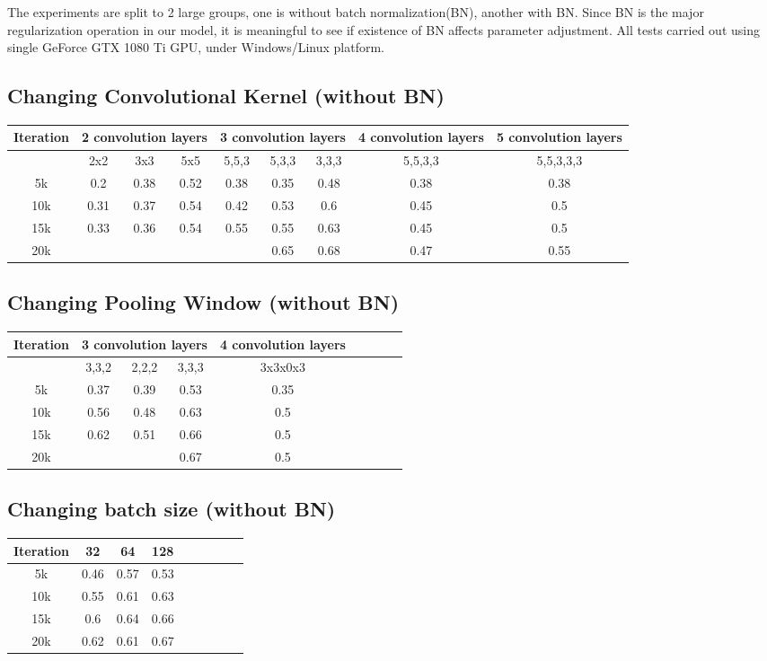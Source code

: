 \documentclass[journal,onecolumn, 12pt]{IEEEtran}
\begin{document}
The experiments are split to 2 large groups, one is without batch normalization(BN), another with BN. Since BN is the major regularization operation in our model, it is meaningful to see if existence of BN affects parameter adjustment. All tests carried out using single GeForce GTX 1080 Ti GPU, under Windows/Linux platform. 

\subsection{Changing Convolutional Kernel (without BN)}

\begin{tabular}{*9c}
  \hline
Iteration & \multicolumn{3}{c}{2 convolution layers} & \multicolumn{3}{c}{3 convolution layers} & \multicolumn{1}{c}{4 convolution layers} & \multicolumn{1}{c}{5 convolution layers} \\
\hline
{} & 2x2 & 3x3 & 5x5 & 5,5,3 & 5,3,3 & 3,3,3 & 5,5,3,3 & 5,5,3,3,3 \\
\hline
5k & 0.2 & 0.38 & 0.52 & 0.38 & 0.35 & 0.48 & 0.38 & 0.38 \\
10k & 0.31 & 0.37 & 0.54 & 0.42 & 0.53 & 0.6 & 0.45 & 0.5 \\
15k & 0.33 & 0.36 & 0.54 & 0.55 & 0.55 & 0.63 & 0.45 & 0.5 \\
20k & {} & {} & {} & {} & 0.65 & 0.68 & 0.47 & 0.55 \\
\hline
\end{tabular}

\subsection{Changing Pooling Window (without BN)}
\begin{tabular}{*9c}
  \hline
Iteration & \multicolumn{3}{c}{3 convolution layers} & \multicolumn{1}{c}{4 convolution layers} \\
\hline
{} & 3,3,2 & 2,2,2 & 3,3,3 & 3x3x0x3 \\
\hline
5k & 0.37 & 0.39 & 0.53 & 0.35 \\
10k & 0.56 & 0.48 & 0.63 & 0.5 \\
15k & 0.62 & 0.51 & 0.66 & 0.5 \\
20k & {} & {} & 0.67 & 0.5 \\
\hline
\end{tabular}

\subsection{Changing batch size (without BN)}
\begin{tabular}{*9c}
  \hline
Iteration & 32 & 64 & 128\\
\hline
5k & 0.46 & 0.57 & 0.53 \\
10k & 0.55 & 0.61 & 0.63 \\
15k & 0.6 & 0.64 & 0.66 \\
20k & 0.62 & 0.61 & 0.67 \\
\hline
\end{tabular}
\end{document}
